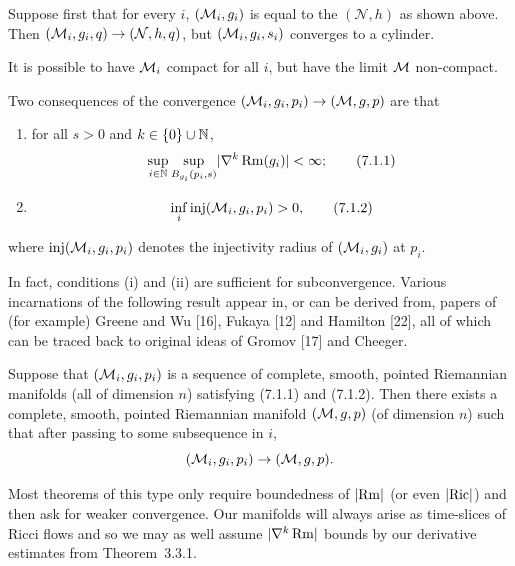 \begin{remark}
\label{topping-ch7-pointed-convergence-example}
Suppose first that for every $i$, $(\mathcal{M}_i,g_i)$ is equal to the
$(\mathcal{N},h)$ as shown above. Then $(\mathcal{M}_i,g_i,q) \to (\mathcal{N},h,q)$,
but $(\mathcal{M}_i,g_i,s_i)$ converges
to a cylinder.
\end{remark}

\begin{remark}
\label{topping-ch7-compact-limit-possible}
It is possible to have $\mathcal{M}_i$ compact for all $i$, but have the limit $\mathcal{M}$
non-compact.
\end{remark}

Two consequences of the convergence $(\mathcal{M}_i,g_i,p_i) \to (\mathcal{M},g,p)$ are that
\begin{enumerate}
\item[(i)] for all $s > 0$ and $k \in \{0\} \cup \mathbb{N}$,
\[
\sup_{i \in \mathbb{N}} \sup_{B_{g_i}(p_i,s)} \lvert \nabla^k \operatorname{Rm}(g_i)\rvert < \infty;
\tag{7.1.1}
\]
\item[(ii)]
\[
\inf_i \operatorname{inj}(\mathcal{M}_i,g_i,p_i) > 0,
\tag{7.1.2}
\]
\end{enumerate}
where $\operatorname{inj}(\mathcal{M}_i,g_i,p_i)$ denotes the injectivity radius of
$(\mathcal{M}_i,g_i)$ at $p_i$.

In fact, conditions (i) and (ii) are sufficient for subconvergence. Various
incarnations of the following result appear in, or can be derived from, papers
of (for example) Greene and Wu [16], Fukaya [12] and Hamilton [22], all of
which can be traced back to original ideas of Gromov [17] and Cheeger.

\begin{theorem}
\label{topping-ch7-compactness-manifolds}
Suppose that $(\mathcal{M}_i,g_i,p_i)$ is a sequence of complete, smooth, pointed
Riemannian manifolds (all of dimension $n$) satisfying (7.1.1) and (7.1.2).
Then there exists a complete, smooth, pointed Riemannian manifold
$(\mathcal{M},g,p)$ (of dimension $n$) such that after passing to some subsequence in
$i$,
\[
(\mathcal{M}_i,g_i,p_i) \to (\mathcal{M},g,p).
\]
\end{theorem}

\begin{remark}
\label{topping-ch7-curvature-control-needed}
Most theorems of this type only require boundedness of $\lvert \operatorname{Rm}\rvert$
(or even $\lvert \operatorname{Ric}\rvert$) and then ask for weaker convergence. Our
manifolds will always arise as time-slices of Ricci flows and so we may as
well assume $\lvert \nabla^k \operatorname{Rm}\rvert$ bounds by our derivative estimates
from Theorem~3.3.1.
\end{remark}

